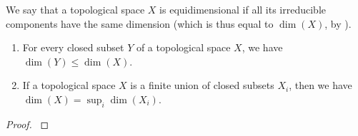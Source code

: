 \begin{defn}[14.1.3]
\label{0.14.1.3}
We say that a topological space $X$ is equidimensional if all its irreducible components have the same dimension (which is thus equal to $\dim(X)$, by ).
\end{defn}

\begin{prop}[14.1.4]
\label{0.14.1.4}
\medskip\noindent
\begin{enumerate}[label=\emph{(\roman*)}]
    \item For every closed subset $Y$ of a topological space $X$, we have $\dim(Y)\leq\dim(X)$.
    \item If a topological space $X$ is a finite union of closed subsets $X_i$, then we have $\dim(X)=\sup_i\dim(X_i)$.
\end{enumerate}
\end{prop}

\begin{proof}
\label{proof-0.14.1.4}
\end{proof}
